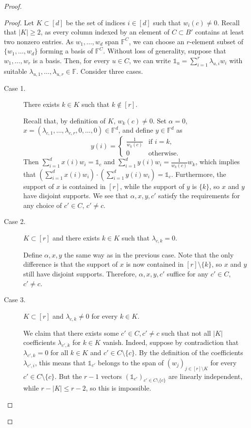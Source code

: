 \begin{proof}
		
	
		\begin{proof}
			Let $K\subset [d]$ be the set of indices $i \in [d]$ such that $w_{i}(c)\neq 0$. Recall that $|K|\geq 2$, as every column indexed by an element of $C\subset B'$ contains at least two nonzero entries. As $w_1,\dots,w_d$ span $\mathbb{F}^{C}$, we can choose an $r$-element subset of $\{w_1,\dots,w_d\}$ forming a basis of $\mathbb{F}^{C}$. Without loss of generality, suppose that $w_1,\dots,w_r$ is a basis. Then, for every $u\in C$, we can write $\mathds{1}_u=\sum_{i=1}^r\lambda_{u,i} w_i$ with suitable $\lambda_{u,1},\dots,\lambda_{u,r}\in\mathbb{F}$. Consider three cases.
			
			\begin{description}
				\item[Case 1.] There exists $k\in K$ such that $k\not\in [r]$. 
				
				Recall that, by definition of $K$, $w_k(c)\not =0$. Set $\alpha=0$, $x=(\lambda_{c,1},\dots,\lambda_{c,r},0,\dots,0) \in \mathbb{F}^d$, and define $y \in \mathbb{F}^d$ as 
				$$y(i)=\begin{cases}\frac{1}{w_k(c)} &\mbox{if }i=k,\\
					0                &\mbox{otherwise}.
				\end{cases}$$
				Then $\sum_{i=1}^d x(i)w_i=\mathds{1}_{c}$ and $\sum_{i=1}^d y(i)w_i=\frac{1}{w_k(c)}w_k$, which implies that $(\sum_{i=1}^d x(i)w_i)\cdot (\sum_{i=1}^d y(i)w_i)=\mathds{1}_c$. Furthermore, the support of $x$ is contained in $[r]$, while the support of $y$ is $\{k\}$, so $x$ and $y$ have disjoint supports. We see that $\alpha,x,y,c'$ satisfy the requirements for any choice of $c'\in C$, $c'\neq c$. 
				
				\item[Case 2.] $K\subset [r]$ and there exists $k\in K$ such that $\lambda_{c,k}=0$. 
				
				Define $\alpha,x,y$ the same way as in the previous case. Note that the only difference is that the support of $x$ is now contained in $[r]\setminus\{k\}$, so $x$ and $y$ still have disjoint supports. Therefore, $\alpha,x,y,c'$ suffice for any $c'\in C$, $c'\neq c$.
				
				\item[Case 3.] $K\subset [r]$ and $\lambda_{c,k}\neq 0$ for every $k\in K$.
				
				We claim that there exists some $c'\in C,c'\neq c$ such that not all $|K|$ coefficients $\lambda_{c',k}$ for $k\in K$ vanish. 
				Indeed, suppose by contradiction that $\lambda_{c',k} = 0$ for all $k\in K$ and $c' \in C \setminus \{c\}$. By the definition of the coefficients $\lambda_{c',i}$, this means that $\mathds{1}_{c'}$ belongs to the span of $(w_j)_{j \in [r] \setminus K}$ for every $c' \in C \setminus \{c\}$. But the $r-1$ vectors $(\mathds{1}_{c'})_{c'\in C \setminus \{c\}}$ are linearly independent, while $r - |K| \leq r-2$, so this is impossible. 
				

\end{description}
\end{proof}
\end{proof}
